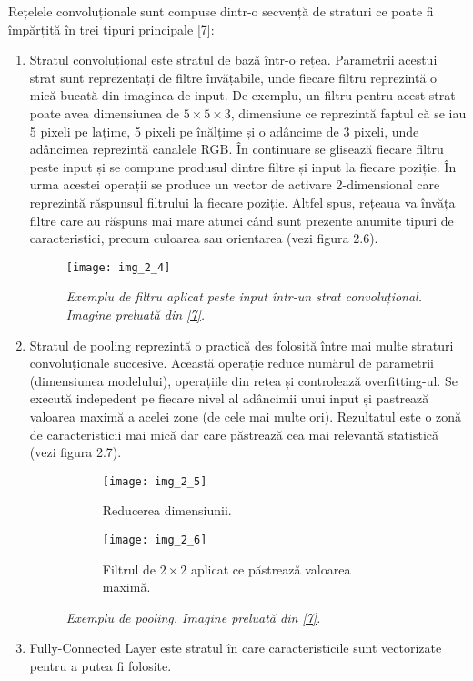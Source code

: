 Rețelele convoluționale sunt compuse dintr-o secvență de straturi ce poate fi împărțită în trei tipuri principale \hyperlink{cs231n}{[7]}:
\begin{enumerate}
  \item Stratul convoluțional este stratul de bază într-o rețea. Parametrii acestui strat sunt reprezentați de filtre învățabile, unde fiecare filtru reprezintă o mică bucată din imaginea de input. De exemplu, un filtru pentru acest strat poate avea dimensiunea de $5 \times 5 \times 3$, dimensiune ce reprezintă faptul că se iau 5 pixeli pe lațime, 5 pixeli pe înălțime și o adâncime de 3 pixeli, unde adâncimea reprezintă canalele RGB. În continuare se glisează fiecare filtru peste input și se compune produsul dintre filtre și input la fiecare poziție. În urma acestei operații se produce un vector de activare 2-dimensional care reprezintă răspunsul filtrului la fiecare poziție. Altfel spus, rețeaua va învăța filtre care au răspuns mai mare atunci când sunt prezente anumite tipuri de caracteristici, precum culoarea sau orientarea (vezi figura 2.6).
\begin{figure}[!h]
	\centering
	\texttt{[image: img\_2\_4]}
	\caption[Exemplu de filtru aplicat peste input]{\textit{Exemplu de filtru aplicat peste input într-un strat convoluțional. Imagine preluată din \hyperlink{datameetsmedia}{[7]}.}}
\end{figure}   
  
  \item Stratul de pooling reprezintă o practică des folosită între mai multe straturi convoluționale succesive. Această operație reduce numărul de parametrii (dimensiunea modelului), operațiile din rețea și controlează overfitting-ul. Se execută indepedent pe fiecare nivel al adâncimii unui input și pastrează valoarea maximă a acelei zone (de cele mai multe ori). Rezultatul este o zonă de caracteristicii mai mică dar care păstrează cea mai relevantă statistică (vezi figura 2.7).
\begin{figure}[!tbp]
  \begin{subfigure}[b]{0.4\textwidth}
    \texttt{[image: img\_2\_5]}
    \caption{Reducerea dimensiunii.}
    \label{fig:f1}
  \end{subfigure}
  \hfill
  \begin{subfigure}[b]{0.4\textwidth}
    \texttt{[image: img\_2\_6]}
    \caption{Filtrul de $2\times2$ aplicat ce păstrează valoarea maximă.}
    \label{fig:f2}
  \end{subfigure}
  \caption[Exemplu de pooling]{\textit{Exemplu de pooling. Imagine preluată din \hyperlink{datameetsmedia}{[7]}.}}
\end{figure}
  
  \item Fully-Connected Layer este stratul în care caracteristicile sunt vectorizate pentru a putea fi folosite.
\end{enumerate}

